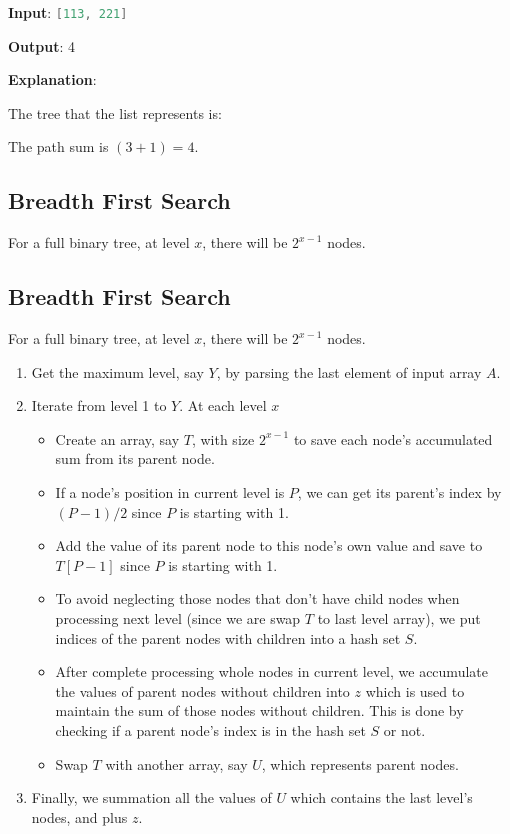 \begin{flushleft}
\textbf{Input}: \lstinline[language=C++, basicstyle=\small\ttfamily, keywordstyle=\bfseries\color{green!40!black}]|[113, 221]|

\textbf{Output}: 4

\textbf{Explanation}: 

The tree that the list represents is: 

\begin{figure}[H]
\end{figure}

The path sum is $(3 + 1) = 4$.
\end{flushleft}

\subsection{Breadth First Search}
For a full binary tree, at level $x$, there will be $2^{x-1}$ nodes.

\subsection{Breadth First Search}
For a full binary tree, at level $x$, there will be $2^{x-1}$ nodes.

\begin{enumerate}
\item Get the maximum level, say $Y$, by parsing the last element of input array $A$.
\item Iterate from level 1 to $Y$. At each level $x$
\begin{itemize}
\item Create an array, say $T$,  with size $2^{x-1}$ to save each node's accumulated sum from its parent node. 
\item If a node's position in current level is $P$, we can get its parent's index by $(P-1)/2$ since $P$ is starting with 1.
\item Add the value of its parent node to this node's own value and save to $T[P-1]$ since $P$ is starting with 1.
\item To avoid neglecting those nodes that don't have child nodes when processing next level (since we are swap $T$ to last level array), we put indices of the parent nodes with children into a hash set $S$. 
\item After complete processing whole nodes in current level, we accumulate the values of parent nodes without children into $z$ which is used to maintain the sum of those nodes without children. This is done by checking if a parent node's index is in the hash set $S$ or not.
\item Swap $T$ with another array, say $U$, which represents parent nodes.
\end{itemize}
\item Finally, we summation all the values of $U$ which contains the last level's nodes, and plus $z$.
\end{enumerate}
